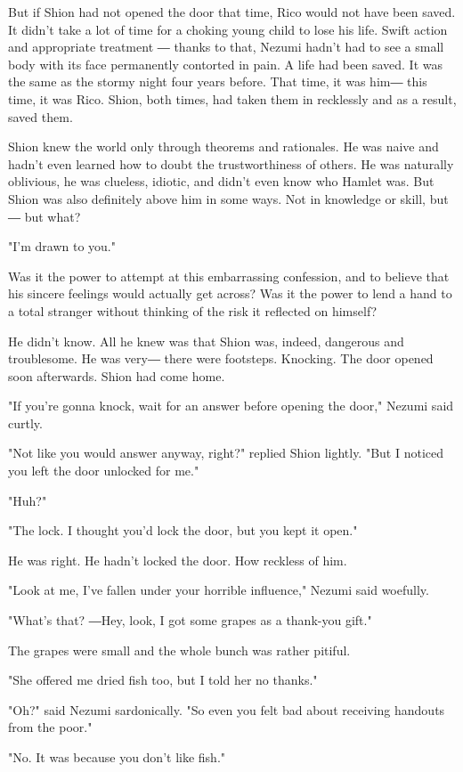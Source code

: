 But if Shion had not opened the door that time, Rico would not have been
saved. It didn't take a lot of time for a choking young child to lose
his life. Swift action and appropriate treatment ― thanks to that,
Nezumi hadn't had to see a small body with its face permanently
contorted in pain. A life had been saved. It was the same as the stormy
night four years before. That time, it was him― this time, it was Rico.
Shion, both times, had taken them in recklessly and as a result, saved
them.

Shion knew the world only through theorems and rationales. He was naive
and hadn't even learned how to doubt the trustworthiness of others. He
was naturally oblivious, he was clueless, idiotic, and didn't even know
who Hamlet was. But Shion was also definitely above him in some ways.
Not in knowledge or skill, but ― but what?

"I'm drawn to you."

Was it the power to attempt at this embarrassing confession, and to
believe that his sincere feelings would actually get across? Was it the
power to lend a hand to a total stranger without thinking of the risk it
reflected on himself?

He didn't know. All he knew was that Shion was, indeed, dangerous and
troublesome. He was very― there were footsteps. Knocking. The door
opened soon afterwards. Shion had come home.

"If you're gonna knock, wait for an answer before opening the door,"
Nezumi said curtly.

"Not like you would answer anyway, right?" replied Shion lightly. "But I
noticed you left the door unlocked for me."

"Huh?"

"The lock. I thought you'd lock the door, but you kept it open."

He was right. He hadn't locked the door. How reckless of him.

"Look at me, I've fallen under your horrible influence," Nezumi said
woefully.

"What's that? ―Hey, look, I got some grapes as a thank-you gift."

The grapes were small and the whole bunch was rather pitiful.

"She offered me dried fish too, but I told her no thanks."

"Oh?" said Nezumi sardonically. "So even you felt bad about receiving
handouts from the poor."

"No. It was because you don't like fish."

